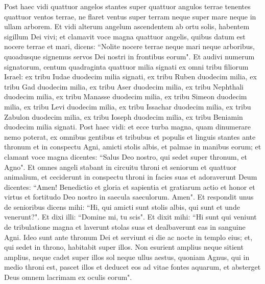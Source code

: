 \begin{biblechapter}  
\verse Post haec vidi quattuor angelos stantes super quattuor angulos terrae tenentes quattuor ventos terrae, ne flaret ventus super terram neque super mare neque in ullam arborem. 
\verse Et vidi alterum angelum ascendentem ab ortu solis, habentem sigillum Dei vivi; et clamavit voce magna quattuor angelis, quibus datum est nocere terrae et mari, 
\verse dicens: “Nolite nocere terrae neque mari neque arboribus, quoadusque signemus servos Dei nostri in frontibus eorum".  
\verse Et audivi numerum signatorum, centum quadraginta quattuor milia signati ex omni tribu filiorum Israel: 
\verse ex tribu Iudae duodecim milia signati, ex tribu Ruben duodecim milia, ex tribu Gad duodecim milia, 
\verse ex tribu Aser duodecim milia, ex tribu Nephthali duodecim milia, ex tribu Manasse duodecim milia, 
\verse ex tribu Simeon duodecim milia, ex tribu Levi duodecim milia, ex tribu Issachar duodecim milia, 
\verse ex tribu Zabulon duodecim milia, ex tribu Ioseph duodecim milia, ex tribu Beniamin duodecim milia signati. 
\verse Post haec vidi: et ecce turba magna, quam dinumerare nemo poterat, ex omnibus gentibus et tribubus et populis et linguis stantes ante thronum et in conspectu Agni, amicti stolis albis, et palmae in manibus eorum; 
\verse et clamant voce magna dicentes: “Salus Deo nostro, qui sedet super thronum, et Agno". 
\verse Et omnes angeli stabant in circuitu throni et seniorum et quattuor animalium, et ceciderunt in conspectu throni in facies suas et adoraverunt Deum 
\verse dicentes: “Amen! Benedictio et gloria et sapientia et gratiarum actio et honor et virtus et fortitudo Deo nostro in saecula saeculorum. Amen". 
\verse Et respondit unus de senioribus dicens mihi: “Hi, qui amicti sunt stolis albis, qui sunt et unde venerunt?". 
\verse Et dixi illi: “Domine mi, tu scis". Et dixit mihi: “Hi sunt qui veniunt de tribulatione magna et laverunt stolas suas et dealbaverunt eas in sanguine Agni. 
\verse Ideo sunt ante thronum Dei et serviunt ei die ac nocte in templo eius; et, qui sedet in throno, habitabit super illos. 
\verse Non esurient amplius neque sitient amplius, neque cadet super illos sol neque ullus aestus, 
\verse quoniam Agnus, qui in medio throni est, pascet illos et deducet eos ad vitae fontes aquarum, et absterget Deus omnem lacrimam ex oculis eorum". 
\end{biblechapter}

